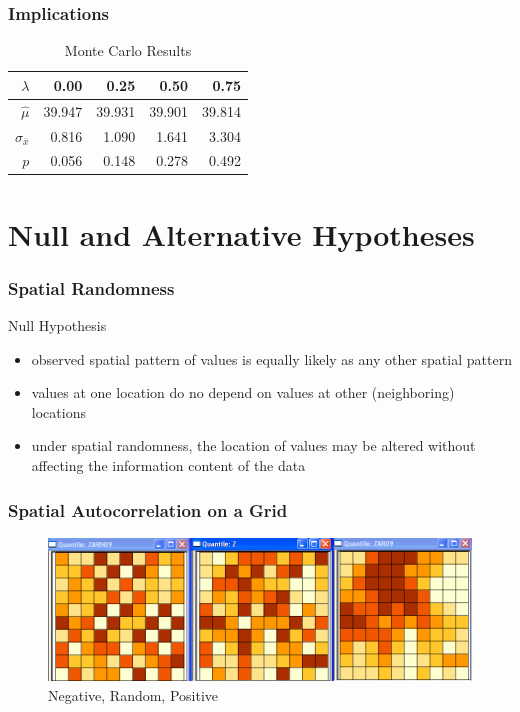 \documentclass[nototal]{beamer}
\begin{document}
\begin{frame}
  \frametitle{Implications}
\begin{table}\caption{Monte Carlo Results}\label{t:sasim}
\begin{center}
\begin{tabular}{  rrrrr  }
\hline
$\lambda$ & 0.00 & 0.25 & 0.50 & 0.75 \\ 
\hline
$\hat{\mu}$ & 39.947 & 39.931 & 39.901 & 39.814 \\
$\sigma_{\bar{x}}$ & 0.816 & 1.090 & 1.641& 3.304 \\
$p$ & 0.056 & 0.148 & 0.278 & 0.492 \\
\hline  
\end{tabular}
\end{center}
\end{table}
\end{frame}

\section{Null and Alternative Hypotheses}

\begin{frame}
  \frametitle{Spatial Randomness}
  \begin{block}{Null Hypothesis}
    \begin{itemize}
      \item observed spatial pattern of values is equally likely as any other
        spatial pattern
      \item values at one location do no depend on values at other
        (neighboring) locations
      \item under spatial randomness, the location of values may be altered
        without affecting the information content of the data
    \end{itemize}
  \end{block}
\end{frame}

  \begin{frame}
    \frametitle{Spatial Autocorrelation on a Grid}
    \begin{center}
      \begin{figure}
      \includegraphics[width=.65\linewidth]{patterns.png}
      \caption{Negative, Random, Positive}
    \end{figure}
    \end{center}
  \end{frame}
\end{document}
